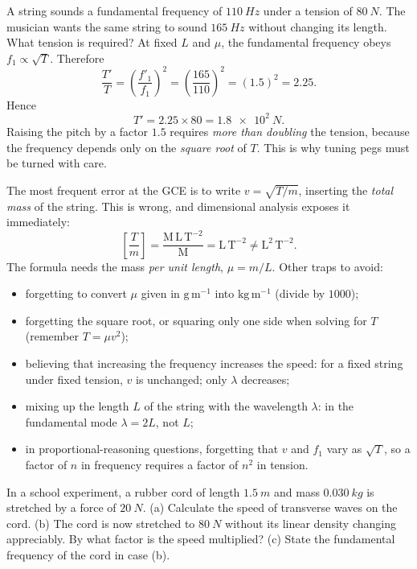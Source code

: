 \documentclass[11pt]{article}
\newcounter{popsec}
\newcounter{popsub}
\newcommand{\courssub}[1]{%
  \stepcounter{popsub}%
  \par\vspace{9pt}\noindent{\popxbold\fontsize{11.5}{13}\selectfont\color{popink}{\color{poporange}\thepopsec.\thepopsub}\hspace{6pt}#1}\par\nopagebreak\vspace{4pt}
}
\begin{document}
\begin{exoresolu}
A string sounds a fundamental frequency of $\SI{110}{Hz}$ under a tension of $\SI{80}{N}$. The musician wants the same string to sound $\SI{165}{Hz}$ without changing its length. What tension is required?
\tcblower
At fixed $L$ and $\mu$, the fundamental frequency obeys $f_1 \propto \sqrt{T}$. Therefore
\[
\frac{T'}{T} = \left(\frac{f'_1}{f_1}\right)^{2}
= \left(\frac{165}{110}\right)^{2}
= (1.5)^{2} = 2.25.
\]
Hence
\[
T' = 2.25\times 80 = \SI{1.8e2}{N}.
\]
Raising the pitch by a factor $1.5$ requires \emph{more than doubling} the tension, because the frequency depends only on the \emph{square root} of $T$. This is why tuning pegs must be turned with care.
\end{exoresolu}

\courssub{Common Mistakes and Key Points}

\begin{attention}
The most frequent error at the GCE is to write $v = \sqrt{T/m}$, inserting the \emph{total mass} of the string. This is wrong, and dimensional analysis exposes it immediately:
\[
\left[\frac{T}{m}\right] = \frac{\mathrm{M\,L\,T^{-2}}}{\mathrm{M}} = \mathrm{L\,T^{-2}} \neq \mathrm{L^{2}\,T^{-2}}.
\]
The formula needs the mass \emph{per unit length}, $\mu = m/L$. Other traps to avoid:
\begin{itemize}
\item forgetting to convert $\mu$ given in $\mathrm{g\,m^{-1}}$ into $\mathrm{kg\,m^{-1}}$ (divide by $1000$);
\item forgetting the square root, or squaring only one side when solving for $T$ (remember $T = \mu v^{2}$);
\item believing that increasing the frequency increases the speed: for a fixed string under fixed tension, $v$ is unchanged; only $\lambda$ decreases;
\item mixing up the length $L$ of the string with the wavelength $\lambda$: in the fundamental mode $\lambda = 2L$, not $L$;
\item in proportional-reasoning questions, forgetting that $v$ and $f_1$ vary as $\sqrt{T}$, so a factor of $n$ in frequency requires a factor of $n^{2}$ in tension.
\end{itemize}
\end{attention}

\begin{exercice}
In a school experiment, a rubber cord of length $\SI{1.5}{m}$ and mass $\SI{0.030}{kg}$ is stretched by a force of $\SI{20}{N}$. (a) Calculate the speed of transverse waves on the cord. (b) The cord is now stretched to $\SI{80}{N}$ without its linear density changing appreciably. By what factor is the speed multiplied? (c) State the fundamental frequency of the cord in case (b).
\end{exercice}
\end{document}
